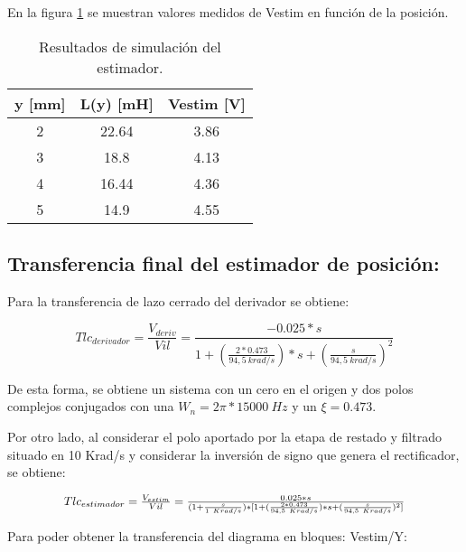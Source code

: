 \noindent En la figura \ref{tab_Resultados_de_simulación_del_estimador} se muestran valores medidos de Vestim en funci\'{o}n de la posici\'{o}n.

\begin{table}[H]
	\begin{center}
		\begin{tabular}{| c | c | c |}
			\hline
		y [mm] & L(y) [mH] & Vestim [V] \\ \hline 
		2 & 22.64 & 3.86 \\ \hline 
		3 & 18.8 & 4.13 \\ \hline 
		4 & 16.44 & 4.36 \\ \hline 
		5 & 14.9 & 4.55 \\ \hline 
		\end{tabular}
		\caption{Resultados de simulación del estimador.}
		\label{tab_Resultados_de_simulación_del_estimador}
	\end{center}
\end{table}

\subsection{Transferencia final del estimador de posici\'{o}n:}

\noindent Para la transferencia de lazo cerrado del derivador se obtiene:

\begin{equation} \label{eq_TLC_deriv_1}
	{Tlc}_{derivador}=\frac{V_{deriv}}{Vil}=\frac{-0.025*s}{1+(\frac{2*0.473}{94,5\ krad/s})*s+(\frac{s}{94,5\ krad/s})^2}
\end{equation}

\noindent De esta forma, se obtiene un sistema con un cero en el origen y dos polos complejos conjugados con una $W_n=2\pi *15000\ Hz$ y un $\xi =0.473$.

\noindent Por otro lado, al considerar el polo aportado por la etapa de restado y filtrado situado en 10 Krad/s y considerar la inversi\'{o}n de signo que genera el rectificador, se obtiene:

\begin{equation} \label{eq_TLC_deriv_2}
	\resizebox{.8\hsize}{!}
	{
	$
	{Tlc}_{estimador}=\frac{V_{estim}}{Vil}=\frac{0.025*s}{(1+\frac{s}{1\ Krad/s})*[1+(\frac{2*0.473}{94,5\ Krad/s})*s+(\frac{s}{94,5\ Krad/s})^2]}
	$
	}
\end{equation}

\noindent Para poder obtener la transferencia del diagrama en bloques: Vestim/Y:


